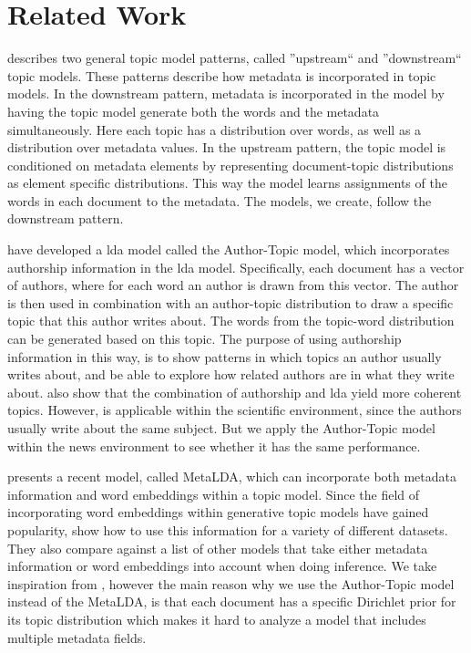 \section{Related Work}\label{sec:related_work}

\citet{mimno2008topic} describes two general topic model patterns, called ''upstream`` and ''downstream`` topic models.
These patterns describe how metadata is incorporated in topic models.
In the downstream pattern, metadata is incorporated in the model by having the topic model generate both the words and the metadata simultaneously.
Here each topic has a distribution over words, as well as a distribution over metadata values.
In the upstream pattern, the topic model is conditioned on metadata elements by representing document-topic distributions as element specific distributions.
This way the model learns assignments of the words in each document to the metadata.
The models, we create, follow the downstream pattern.

\citet{author_topic_2012} have developed a \gls{lda} model called the Author-Topic model, which incorporates authorship information in the \gls{lda} model.
Specifically, each document has a vector of authors, where for each word an author is drawn from this vector.
The author is then used in combination with an author-topic distribution to draw a specific topic that this author writes about.
The words from the topic-word distribution can be generated based on this topic.
The purpose of using authorship information in this way, is to show patterns in which topics an author usually writes about, and be able to explore how related authors are in what they write about.
\citeauthor{author_topic_2012} also show that the combination of authorship and \gls{lda} yield more coherent topics.
However, \citet{author_topic_2012} is applicable within the scientific environment, since the authors usually write about the same subject.
But we apply the Author-Topic model within the news environment to see whether it has the same performance.

\citet{MetaLDA2017} presents a recent model, called MetaLDA, which can incorporate both metadata information and word embeddings within a topic model.
Since the field of incorporating word embeddings within generative topic models have gained popularity\cite{dieng2020topic}, \citet{MetaLDA2017} show how to use this information for a variety of different datasets.
They also compare against a list of other models that take either metadata information or word embeddings into account when doing inference.
We take inspiration from \citet{MetaLDA2017}, however the main reason why we use the Author-Topic model instead of the MetaLDA, is that each document has a specific Dirichlet prior for its topic distribution which makes it hard to analyze a model that includes multiple metadata fields.

